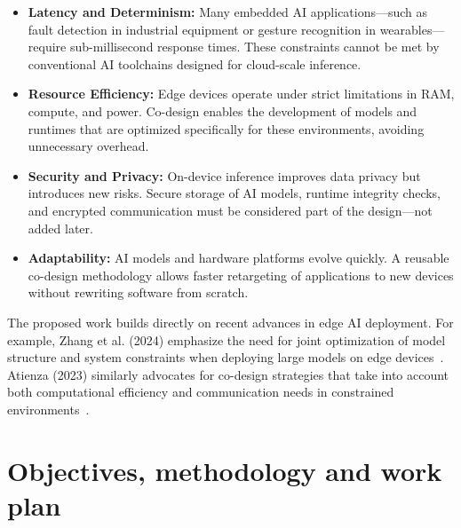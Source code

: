\begin{itemize}
    \item \textbf{Latency and Determinism:} Many embedded AI applications—such as fault detection in industrial equipment or gesture recognition in wearables—require sub-millisecond response times. These constraints cannot be met by conventional AI toolchains designed for cloud-scale inference.

    \item \textbf{Resource Efficiency:} Edge devices operate under strict limitations in RAM, compute, and power. Co-design enables the development of models and runtimes that are optimized specifically for these environments, avoiding unnecessary overhead.

    \item \textbf{Security and Privacy:} On-device inference improves data privacy but introduces new risks. Secure storage of AI models, runtime integrity checks, and encrypted communication must be considered part of the design—not added later.

    \item \textbf{Adaptability:} AI models and hardware platforms evolve quickly. A reusable co-design methodology allows faster retargeting of applications to new devices without rewriting software from scratch.
\end{itemize}

The proposed work builds directly on recent advances in edge AI deployment. For example, Zhang et al. (2024) emphasize the need for joint optimization of model structure and system constraints when deploying large models on edge devices~\cite{zhang2024edge}. Atienza (2023) similarly advocates for co-design strategies that take into account both computational efficiency and communication needs in constrained environments~\cite{atienza2023codesign}.

\section{Objectives, methodology and work plan}

